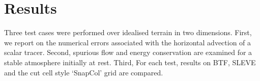\chapter{Results}
Three test cases were performed over idealised terrain in two dimensions.  First, we report on the numerical errors associated with the horizontal advection of a scalar tracer.  Second, spurious flow and energy conservation are examined for a stable atmosphere initially at rest.  Third,   For each test, results on BTF, SLEVE and the cut cell style `SnapCol' grid are compared.  






